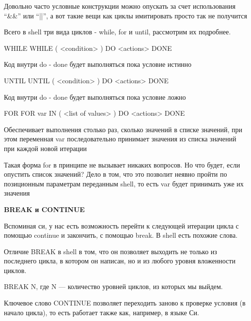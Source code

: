 Довольно часто условные конструкции можно опускать за счет использования “\&\&” или “||”, а вот такие вещи как циклы имитировать просто так не получится

Всего в shell три вида циклов - while, for и until, рассмотрим их подробнее.

\begin{shCode}{WHILE}
	WHILE ( <condition> )
		DO
	 		<actions>
		DONE
\end{shCode}
Код внутри do - done будет выполняться пока условие истинно

\begin{shCode}{UNTIL}
	UNTIL ( <condition> )
		DO
			<actions>
		DONE
\end{shCode}
Код внутри do - done будет выполняться пока условие ложно

\begin{shCode}{FOR}
	FOR var IN ( <list of values> )
		DO
			<actions>
		DONE
\end{shCode}
Обеспечивает выполнения столько раз, сколько значений в списке значений, при этом переменная var последовательно принимает значения из списка значений при каждой новой итерации

Такая форма for в принципе не вызывает никаких вопросов. Но что будет, если опустить список значений? Дело в том, что это позволит неявно пройти по позиционным параметрам переданным shell, то есть var будет принимать уже их значения

\textbf{BREAK и CONTINUE}

Вспоминая си, у нас есть возможность перейти к следующей итерации цикла с помощью continue и закончить, с помощью break. В shell есть похожие слова. 

Отличие BREAK в shell в том, что он  позволяет выходить не только из последнего цикла, в  котором он написан, но и из любого уровня вложенности циклов. 

BREAK N, где N --- количество уровней циклов, из которых мы выйдем.

Ключевое слово CONTINUE позволяет переходить заново к проверке условия (в начало цикла), то есть работает также как, например, в языке Си. 
